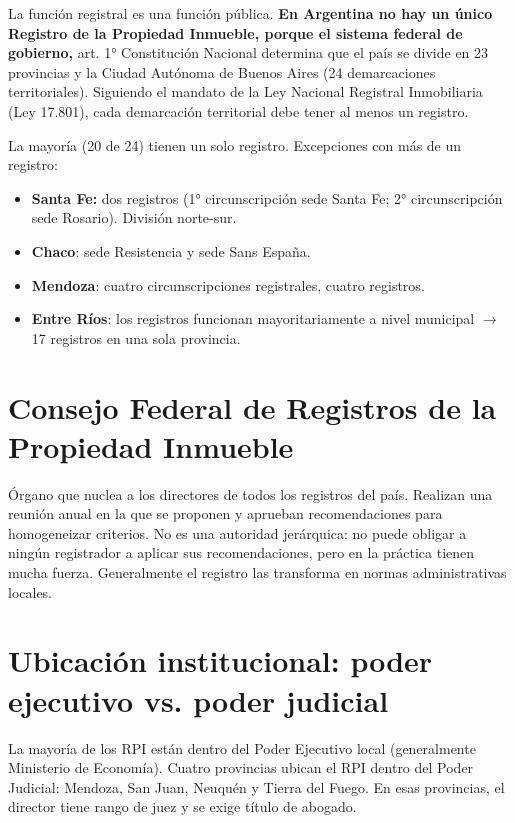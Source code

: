 \documentclass[12pt,oneside]{book}
\begin{document}
La función registral es una función pública. \textbf{En Argentina no hay un único Registro de la Propiedad Inmueble, porque el sistema federal de gobierno,} art. 1° Constitución Nacional determina que el país se divide en 23 provincias y la Ciudad Autónoma de Buenos Aires (24 demarcaciones territoriales). Siguiendo el mandato de la Ley Nacional Registral Inmobiliaria (Ley 17.801), cada demarcación territorial debe tener al menos un registro.

La mayoría (20 de 24) tienen un solo registro. Excepciones con más de un registro:

\begin{itemize}
    \item \textbf{Santa Fe:} dos registros (1° circunscripción sede Santa Fe; 2° circunscripción sede Rosario). División norte-sur.
    \item \textbf{Chaco}: sede Resistencia y sede Sans España.
    \item \textbf{Mendoza}: cuatro circunscripciones registrales, cuatro registros.
    \item \textbf{Entre Ríos}: los registros funcionan mayoritariamente a nivel municipal $\rightarrow$ 17 registros en una sola provincia.
\end{itemize}

\section{Consejo Federal de Registros de la Propiedad Inmueble}
\label{sec:consejo-federal}

Órgano que nuclea a los directores de todos los registros del país. Realizan una reunión anual en la que se proponen y aprueban recomendaciones para homogeneizar criterios. No es una autoridad jerárquica: no puede obligar a ningún registrador a aplicar sus recomendaciones, pero en la práctica tienen mucha fuerza. Generalmente el registro las transforma en normas administrativas locales.

\section{Ubicación institucional: poder ejecutivo vs. poder judicial}
\label{sec:ubicacion-institucional}

La mayoría de los RPI están dentro del Poder Ejecutivo local (generalmente Ministerio de Economía). Cuatro provincias ubican el RPI dentro del Poder Judicial: Mendoza, San Juan, Neuquén y Tierra del Fuego. En esas provincias, el director tiene rango de juez y se exige título de abogado.
\end{document}

